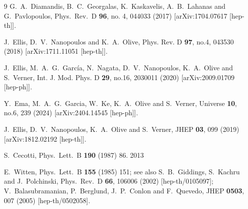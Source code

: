 \documentclass[aps,prev,twocolumn,preprintnumbers,floatfix,nofootinbib]{revtex4-1}
\begin{document}
\begin{thebibliography}{9}
   G.~A.~Diamandis, B.~C.~Georgalas, K.~Kaskavelis, A.~B.~Lahanas and G.~Pavlopoulos,
  Phys.\ Rev.\ D {\bf 96}, no. 4, 044033 (2017)
  [arXiv:1704.07617 [hep-th]].
 
J.~Ellis, D.~V.~Nanopoulos and K.~A.~Olive,
Phys. Rev. D \textbf{97}, no.4, 043530 (2018)
[arXiv:1711.11051 [hep-th]].

  
J.~Ellis, M.~A.~G.~Garc{\' i}a, N.~Nagata, D.~V.~Nanopoulos, K.~A.~Olive and S.~Verner,
Int. J. Mod. Phys. D \textbf{29}, no.16, 2030011 (2020)
[arXiv:2009.01709 [hep-ph]].


Y.~Ema, M.~A.~G.~Garcia, W.~Ke, K.~A.~Olive and S.~Verner,
Universe \textbf{10}, no.6, 239 (2024)
[arXiv:2404.14545 [hep-ph]].

J.~Ellis, D.~V.~Nanopoulos, K.~A.~Olive and S.~Verner,
JHEP \textbf{03}, 099 (2019)
[arXiv:1812.02192 [hep-th]].

  S.~Cecotti,
  Phys.\ Lett.\ B {\bf 190} (1987) 86.
  2013



E.~Witten,
  Phys.\ Lett.\ B {\bf 155} (1985) 151;
  see also
  S.~B.~Giddings, S.~Kachru and J.~Polchinski,
  Phys.\ Rev.\ D {\bf 66}, 106006 (2002)
  [hep-th/0105097];
  V.~Balasubramanian, P.~Berglund, J.~P.~Conlon and F.~Quevedo,
  JHEP {\bf 0503}, 007 (2005)
  [hep-th/0502058].


\end{thebibliography}
\end{document}
